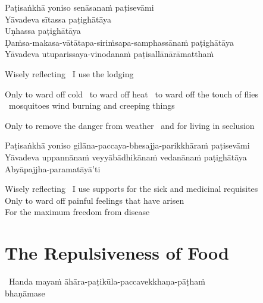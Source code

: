 Paṭisaṅkhā yoniso senāsanaṁ paṭisevāmi\\
Yāvadeva sītassa paṭighātāya\\
Uṇhassa paṭighātāya\\
Ḍaṁsa-makasa-vātātapa-siriṁsapa-samphassānaṁ paṭighātāya\\
Yāvadeva utuparissaya-vinodanaṁ paṭisallānārāmatthaṁ

\begin{english-keepwith}
  Wisely reflecting \breathmark\ I use the lodging
  \begin{english-hangtogether}
    Only to ward off cold \breathmark\ to ward off heat \breathmark\ to ward off the touch of flies \breathmark\ mosquitoes wind burning and creeping things
  \end{english-hangtogether}
  \begin{english-hangtogether}
    Only to remove the danger from weather \breathmark\ and for living in seclusion
  \end{english-hangtogether}
\end{english-keepwith}

Paṭisaṅkhā yoniso gilāna-paccaya-bhesajja-parikkhāraṁ paṭisevāmi\\
Yāvadeva uppannānaṁ veyyābādhikānaṁ vedanānaṁ paṭighātāya\\
Abyāpajjha-paramatāyā'ti

\begin{english-verses}
  Wisely reflecting \breathmark\ I use supports for the sick and medicinal requisites\\
  Only to ward off painful feelings that have arisen\\
  For the maximum freedom from disease
\end{english-verses}

\suttaRef{[MN 2]}


\section{The Repulsiveness of Food}
\label{repulsiveness-of-food}

\begin{leader}
  \anglebracketleft\ \hspace{-0.5mm}Handa mayaṁ āhāra-paṭikūla-paccavekkhaṇa-pāṭhaṁ\\ bhaṇāmase \hspace{-0.5mm}\anglebracketright\
\end{leader}

